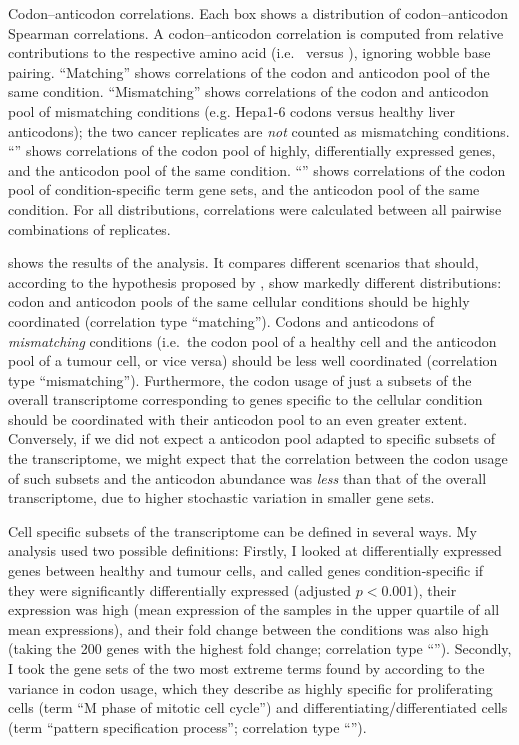     {Codon--anticodon correlations.}
    {Each box shows a distribution of codon--anticodon Spearman correlations.
    A codon--anticodon correlation is computed from relative contributions to
    the respective amino acid (i.e.\  versus ), ignoring
    wobble base pairing. “Matching” shows correlations of the codon and
    anticodon pool of the same condition. “Mismatching” shows correlations of
    the codon and anticodon pool of mismatching conditions (e.g. Hepa1-6 codons
    versus healthy liver anticodons); the two cancer replicates are \emph{not}
    counted as mismatching conditions. “” shows correlations of the
    codon pool of highly, differentially expressed \mrna genes, and the
    anticodon pool of the same condition. “” shows correlations of the
    codon pool of condition-specific  term gene sets, and the anticodon
    pool of the same condition. For all distributions, correlations were
    calculated between all pairwise combinations of replicates.}

 shows the results of the analysis. It compares different
scenarios that should, according to the hypothesis proposed by
\citet{Gingold:2014}, show markedly different distributions: codon and anticodon
pools of the same cellular conditions should be highly coordinated (correlation
type “matching”). Codons and anticodons of \emph{mismatching} conditions (i.e.\
the codon pool of a healthy cell and the anticodon pool of a tumour cell, or
vice versa) should be less well coordinated (correlation type “mismatching”).
Furthermore, the codon usage of just a subsets of the overall transcriptome
corresponding to genes specific to the cellular condition should be coordinated
with their anticodon pool to an even greater extent. Conversely, if we did not
expect a \trna anticodon pool adapted to specific subsets of the transcriptome,
we might expect that the correlation between the codon usage of such subsets and
the anticodon abundance was \emph{less} than that of the overall transcriptome,
due to higher stochastic variation in smaller gene sets.

Cell specific subsets of the transcriptome can be defined in several ways. My
analysis used two possible definitions: Firstly, I looked at differentially
expressed genes between healthy and tumour cells, and called genes
condition-specific if they were significantly differentially expressed (adjusted
\(p < 0.001\)), their expression was high (mean expression of the samples in the
upper quartile of all mean expressions), and their fold change between the
conditions was also high (taking the \num{200} genes with the highest fold
change; correlation type “\abbr{de}”). Secondly, I took the gene sets of the two
most extreme \go terms found by \citet{Gingold:2014} according to the variance
in codon usage, which they describe as highly specific for proliferating cells
(\go term “M phase of mitotic cell cycle”) and differentiating/differentiated
cells (\go term “pattern specification process”; correlation type “\abbr{go}”).

